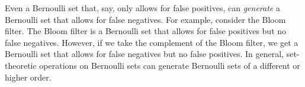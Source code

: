 Even a Bernoulli set that, say, only allows for false positives, can {\itshape generate} a Bernoulli set that allows for false negatives. For example, consider the Bloom filter. The Bloom filter is a Bernoulli set that allows for false positives but no false negatives. However, if we take the complement of the Bloom filter, we get a Bernoulli set that allows for false negatives but no false positives. In general, set-\/theoretic operations on Bernoulli sets can generate Bernoulli sets of a different or higher order. 
